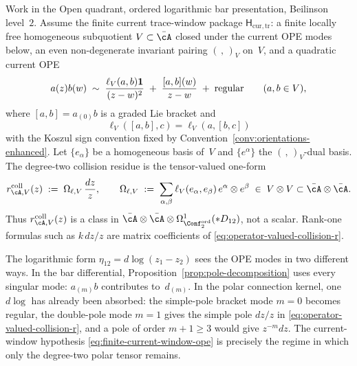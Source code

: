 \begin{proposition}
\label{prop:operator-valued-collision-residue-trace}
Work in the Open quadrant, ordered logarithmic bar presentation,
Beilinson level~$2$. Assume the finite current trace-window package
$\mathsf H_{\mathrm{cur,tr}}$: a finite locally free homogeneous
subquotient $V\subset\bar\cA$ closed under the current OPE modes below,
an even non-degenerate invariant pairing $(\,,\,)_V$ on~$V$, and a
quadratic current OPE
\begin{equation}\label{eq:finite-current-window-ope}
a(z)b(w)
\;\sim\;
\frac{\ell_V(a,b)\mathbf{1}}{(z-w)^2}
\;+\;
\frac{[a,b](w)}{z-w}
\;+\; \textup{regular}
\qquad (a,b\in V),
\end{equation}
where $[a,b]=a_{(0)}b$ is a graded Lie bracket and
\[
\ell_V([a,b],c)=\ell_V(a,[b,c])
\]
with the Koszul sign convention fixed by
Convention~\ref{conv:orientations-enhanced}. Let
$\{e_\alpha\}$ be a homogeneous basis of~$V$ and
$\{e^\alpha\}$ the $(\,,\,)_V$-dual basis. The degree-two collision
residue is the tensor-valued one-form
\begin{equation}\label{eq:operator-valued-collision-r}
r^{\mathrm{coll}}_{\cA,V}(z)
\;:=\;
\Omega_{\ell,V}\,\frac{dz}{z},
\qquad
\Omega_{\ell,V}
\;:=\;
\sum_{\alpha,\beta}\ell_V(e_\alpha,e_\beta)\,
e^\alpha\otimes e^\beta
\;\in\; V\otimes V\subset\bar\cA\otimes\bar\cA .
\end{equation}
Thus $r^{\mathrm{coll}}_{\cA,V}(z)$ is a class in
$\bar\cA\otimes\bar\cA\otimes
\Omega^1_{\Conf^{\mathrm{ord}}_2}(*D_{12})$, not a scalar.
Rank-one formulas such as $k\,dz/z$ are matrix coefficients of
\eqref{eq:operator-valued-collision-r}.

The logarithmic form $\eta_{12}=d\log(z_1-z_2)$ sees the OPE modes in
two different ways. In the bar differential, Proposition~\ref{prop:pole-decomposition}
uses every singular mode: $a_{(m)}b$ contributes to~$d_{(m)}$. In the
polar connection kernel, one $d\log$ has already been absorbed: the
simple-pole bracket mode $m=0$ becomes regular, the double-pole mode
$m=1$ gives the simple pole $dz/z$ in
\eqref{eq:operator-valued-collision-r}, and a pole of order $m+1\ge3$
would give $z^{-m}dz$. The current-window hypothesis
\eqref{eq:finite-current-window-ope} is precisely the regime in which
only the degree-two polar tensor remains.


\end{proposition}
